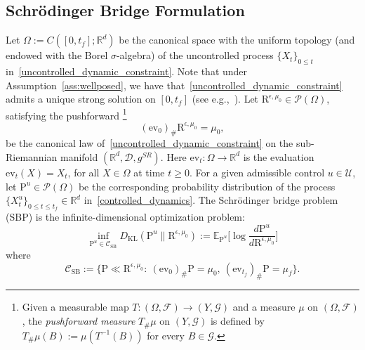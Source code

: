 \documentclass{amsart}
\numberwithin{equation}{section}
\newcommand{\R}{\mathbb{R}}
\newcommand{\map}[3]{#1:#2 \rightarrow #3}
\newcommand{\KL}{D_{\mathrm{KL}}}
\begin{document}
\subsection{Schr\"odinger Bridge Formulation}
Let $\Omega:=C([0,t_f];\mathbb R^d)$ be the canonical space  with the uniform topology (and endowed with the Borel $\sigma$-algebra) of the uncontrolled process $\{ X_t\}_{0\leq t}$ in~\eqref{uncontrolled_dynamic_constraint}. Note that under Assumption~\ref{ass:wellposed}, we have that~\eqref{uncontrolled_dynamic_constraint} admits a unique strong solution on $[0,t_f]$ (see e.g.,~\cite{oksendal2003stochastic}). Let $\mathrm{R}^{\epsilon,\mu_0}\in\mathcal P(\Omega)$, satisfying the pushforward \footnote{Given a measurable map $\map{T}{ (\Omega,\mathcal{F})}{(Y,\mathcal{G})}$ 
and a measure $\mu$ on $(\Omega,\mathcal{F})$, 
the \emph{pushforward measure} $T_\# \mu$ on $(Y,\mathcal{G})$ is defined by 
$T_\# \mu(B) := \mu(T^{-1}(B))$ for every $B \in \mathcal{G}$.} 
\begin{equation}\label{eq: law of unreflected process}
 ( \mathrm{ev}_0)_\# \mathrm{R}^{\epsilon,\mu_0} = \mu_0,   
\end{equation} 
 be the canonical law of~\eqref{uncontrolled_dynamic_constraint} on the sub-Riemannian manifold $(\R^d,\mathcal{D},g^{SR})$. Here $\map{\mathrm{ev}_t}{\Omega}{\R^d}$ is the evaluation $\mathrm{ev}_t(X)=X_t$, for all $X\in\Omega$ at time $t\geq 0$. For a given admissible control $u \in \mathcal{U}$, let $\mathrm{P}^u \in \mathcal{P}(\Omega)$ be the corresponding probability distribution of the process $\{ X_t^u\}_{0\leq t\leq t_f}\in \mathbb{R}^d$ in~\eqref{controlled_dynamics}. The Schr\"odinger bridge problem (SBP) is the infinite-dimensional optimization problem: 
\begin{equation}\label{sbp_precise}
\inf_{\mathrm{P}^u \in \mathcal C_{\mathrm{SB}}} \KL(\mathrm{P}^u \| \mathrm{R}^{\epsilon,\mu_0}):= \mathbb{E}_{\mathrm{P}^u} \Bigg[ \log \frac{d\mathrm{P}^u}{d\mathrm{R}^{\epsilon,\mu_0}} \Bigg] 
\end{equation}
where
\[
\mathcal C_{\mathrm{SB}}
:= \Big\{\mathrm{P}\ll\mathrm{R}^{\epsilon,\mu_0} :\ 
(\mathrm{ev}_0)_\#\mathrm{P}=\mu_0,\ (\mathrm{ev}_{t_f})_\#\mathrm{P}=\mu_f\Big\}.
\]
\end{document}
